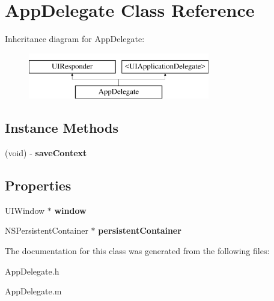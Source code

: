 \hypertarget{interface_app_delegate}{}\section{App\+Delegate Class Reference}
\label{interface_app_delegate}
Inheritance diagram for App\+Delegate\+:\begin{figure}[H]
\begin{center}
\leavevmode
\includegraphics[height=2.000000cm]{interface_app_delegate}
\end{center}
\end{figure}
\subsection*{Instance Methods}
\begin{DoxyCompactItemize}
\item 
\mbox{\label{interface_app_delegate_affcb482ed45b506b0659be7277e805f9}} 
(void) -\/ {\bfseries save\+Context}
\end{DoxyCompactItemize}
\subsection*{Properties}
\begin{DoxyCompactItemize}
\item 
\mbox{\label{interface_app_delegate_acf48ac24125e688cac1a85445cd7fac2}} 
U\+I\+Window $\ast$ {\bfseries window}
\item 
\mbox{\label{interface_app_delegate_adc2fe63fe75ff85c7dff3b96a1823251}} 
N\+S\+Persistent\+Container $\ast$ {\bfseries persistent\+Container}
\end{DoxyCompactItemize}


The documentation for this class was generated from the following files\+:\begin{DoxyCompactItemize}
\item 
App\+Delegate.\+h\item 
App\+Delegate.\+m\end{DoxyCompactItemize}
